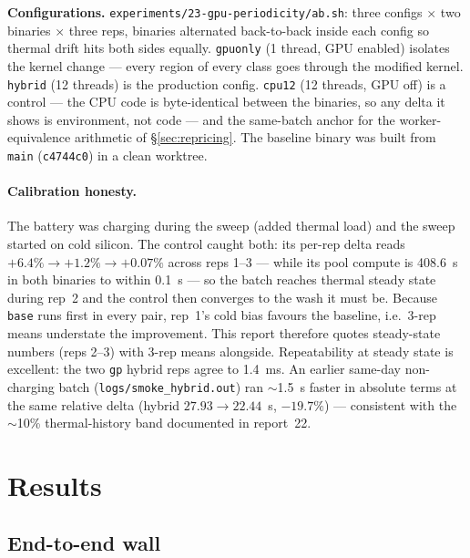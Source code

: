 \documentclass[
	english,
	letterpaper, oneside
]{article}
\begin{document}
\textbf{Configurations.} \texttt{experiments/23-gpu-periodicity/ab.sh}: three
configs $\times$ two binaries $\times$ three reps, binaries alternated
back-to-back inside each config so thermal drift hits both sides equally.
\texttt{gpuonly} (1 thread, GPU enabled) isolates the kernel change --- every
region of every class goes through the modified kernel. \texttt{hybrid}
(12 threads) is the production config. \texttt{cpu12} (12 threads, GPU off) is
a control --- the CPU code is byte-identical between the binaries, so any
delta it shows is environment, not code --- and the same-batch anchor for
the worker-equivalence arithmetic of \S\ref{sec:repricing}. The baseline
binary was built from \texttt{main} (\texttt{c4744c0}) in a clean worktree.

\paragraph{Calibration honesty.} The battery was charging during the sweep
(added thermal load) and the sweep started on cold silicon. The control
caught both: its per-rep delta reads $+6.4\% \to +1.2\% \to +0.07\%$ across
reps 1--3 --- while its pool compute is 408.6~s in both binaries to
within 0.1~s --- so the batch reaches thermal steady state during rep~2 and
the control then converges to the wash it must be. Because \texttt{base}
runs first in every pair, rep~1's cold bias favours the baseline, i.e.\
3-rep means understate the improvement. This report therefore quotes
steady-state numbers (reps 2--3) with 3-rep means alongside.
Repeatability at steady state is excellent: the two \texttt{gp} hybrid reps
agree to 1.4~ms. An earlier same-day non-charging batch
(\texttt{logs/smoke\_hybrid.out}) ran $\sim$1.5~s faster in absolute terms
at the same relative delta (hybrid $27.93 \to 22.44$~s, $-19.7\%$) ---
consistent with the $\sim$10\% thermal-history band documented in
report~22.

\section{Results}
\label{sec:results}

\subsection{End-to-end wall}
\end{document}
